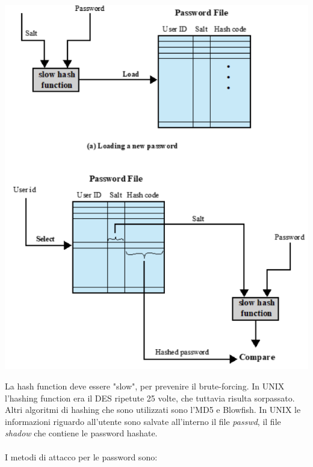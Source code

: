 \documentclass[11pt, oneside]{article}   	%
\begin{document}
 \begin{center}
\includegraphics[scale=0.7]{salt}
\end{center}
La hash function deve essere "slow", per prevenire il brute-forcing. In UNIX l'hashing function era il DES ripetute 25 volte, che tuttavia risulta sorpassato. Altri algoritmi di hashing che sono utilizzati sono l'MD5 e Blowfish. In UNIX le informazioni riguardo all'utente sono salvate all'interno il file \emph{passwd}, il file \emph{shadow} che contiene le password hashate.\\ \\
I metodi di attacco per le password sono:
\end{document}
